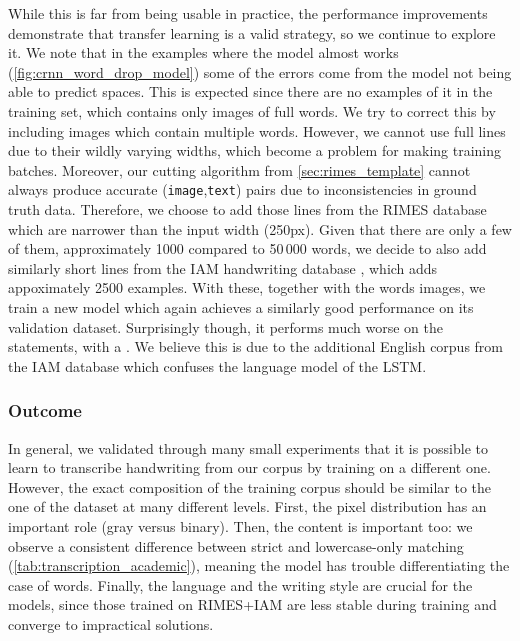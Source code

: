 		While this is far from being usable in practice, the performance improvements demonstrate that transfer learning is a valid strategy, so we continue to explore it. We note that in the examples where the model almost works (\autoref{fig:crnn_word_drop_model}) some of the errors come from the model not being able to predict spaces. This is expected since there are no examples of it in the training set, which contains only images of full words. We try to correct this by including images which contain multiple words. However, we cannot use full lines due to their wildly varying widths, which become a problem for making training batches. Moreover, our cutting algorithm from \autoref{sec:rimes_template} cannot always produce accurate (\texttt{image},\texttt{text}) pairs due to inconsistencies in ground truth data. Therefore, we choose to add those lines from the RIMES database which are narrower than the input width (250px). Given that there are only a few of them, approximately 1000 compared to 50\,000 words, we decide to also add similarly short lines from the IAM handwriting database \citep{iam}, which adds appoximately 2500 examples. With these, together with the words images, we train a new model which again achieves a similarly good performance on its validation dataset. Surprisingly though, it performs much worse on the statements, with a . We believe this is due to the additional English corpus from the IAM database which confuses the language model of the LSTM.

		\subsubsection*{Outcome}
		In general, we validated through many small experiments that it is possible to learn to transcribe handwriting from our corpus by training on a different one. However, the exact composition of the training corpus should be similar to the one of the  dataset at many different levels. First, the pixel distribution has an important role (gray versus binary). Then, the content is important too: we observe a consistent difference between strict and lowercase-only matching (\autoref{tab:transcription_academic}), meaning the model has trouble differentiating the case of words. Finally, the language and the writing style are crucial for the models, since those trained on RIMES+IAM are less stable during training and converge to impractical solutions.

